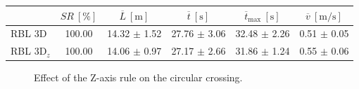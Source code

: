 \begin{itemize}
\begin{table}[H]
                    \begin{tabular}{|l|c|c|c|c|c|}
                    \hline
                                                & \( SR \ [\%] \) & \( \overline{L} \ [\mathrm{m}] \) & \( \overline{t} \ [\mathrm{s}] \) & \( \overline{t}_{\text{max}} \ [\mathrm{s}] \) & \( \overline{v} \ [\mathrm{m/s}] \)     \\ \hline
                    RBL \ac{3D}                      & 100.00          & 14.32 $\pm$ 1.52                  & 27.76 $\pm$ 3.06                  & 32.48 $\pm$ 2.26                               & 0.51 $\pm$ 0.05                         \\ \hline
                    RBL \ac{3D}\(_z\)                & 100.00          & 14.06 $\pm$ 0.97                  & 27.17 $\pm$ 2.66                  & 31.86 $\pm$ 1.24                               & 0.55 $\pm$ 0.06                         \\ \hline
                    \end{tabular}
                \end{table}
        \end{itemize}

        \begin{figure}[H]
            \centering
            \caption{
                Effect of the Z-axis rule on the circular crossing. 
            }
            \label{fig:z_ax_rule_cross}
        \end{figure}


